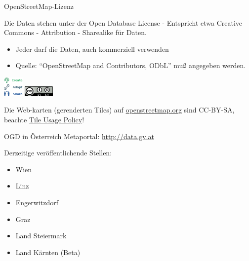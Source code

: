 \documentclass{beamer}
\begin{document}
\begin{frame}{OpenStreetMap-Lizenz}

Die Daten stehen unter der Open Database License - Entspricht etwa Creative Commons - Attribution - Sharealike für Daten.
\begin{itemize}
  \item Jeder darf die Daten, auch kommerziell verwenden
  \item Quelle: ``OpenStreetMap and Contributors, ODbL'' muß angegeben werden.
\end{itemize}

 \begin{center}
 \includegraphics[width=1cm]{ODbL.png}
 \hspace{2cm}
 \includegraphics[width=1.5cm]{cc-by-sa.png}
 \end{center}

\pause
Die Web-karten (gerenderten Tiles) auf \href{http://osm.org}{openstreetmap.org} sind CC-BY-SA, beachte \href{http://wiki.openstreetmap.org/wiki/Tile\_usage\_policy}{Tile Usage Policy}!

\end{frame}


\begin{frame}{OGD in Österreich}
	Metaportal: \url{http://data.gv.at}

	\vspace{3mm}

	Derzeitige veröffentlichende Stellen:
	\begin{itemize}
		\item Wien
		\item Linz
		\item Engerwitzdorf
		\item Graz
		\item Land Steiermark
			\pause
		\item Land Kärnten (Beta)
	\end{itemize}
\end{frame}
\end{document}
